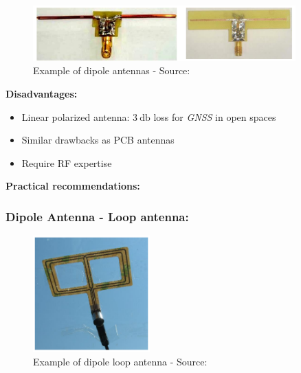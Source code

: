 \documentclass[report.tex]{subfiles}
\begin{document}
\begin{figure}[H]
	\centering
	\includegraphics[width=0.9\textwidth]{Include/Figure/antenna/dipole_antenna.png}
	\caption{Example of dipole antennas - Source:\cite{gnss_ant_intro}}
	\label{fig:dipole_antenna}
\end{figure}
  
\begin{flushleft}
\textbf{Disadvantages:}
\end{flushleft}
\begin{itemize}
\item Linear polarized antenna: $\SI{3}{\decibel}$ loss for \textit{GNSS} in open spaces
\item Similar drawbacks as PCB antennas
\item Require RF expertise
\end{itemize}

\begin{flushleft}
\textbf{Practical recommendations:}
\end{flushleft}

\subsubsection{Dipole Antenna - Loop antenna:}

\begin{figure}[H]
	\centering
	\includegraphics[width=0.4\textwidth]{Include/Figure/antenna/loop_antenna.png}
	\caption{Example of dipole loop antenna - Source:\cite{gnss_ant_intro}}
	\label{fig:loop_antenna}
\end{figure}
\end{document}
